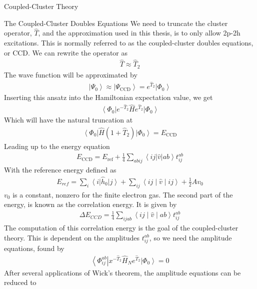 \documentclass[twoside,english]{uiofysmaster}
\begin{document}
\begin{chapter}{Coupled-Cluster Theory}
  	\begin{section}{The Coupled-Cluster Doubles Equations}
  		We need to truncate the cluster operator, $\hat T$, and the approximation used in this thesis, is to only allow 2p-2h excitations. This is normally referred to as the coupled-cluster doubles equations, or CCD. We can rewrite the operator as \cite{MHJonline}
  		\begin{align}
  			\hat T \approx \hat T_2
  		\end{align}
  		The wave function will be approximated by 
  		\begin{align}
  			\left| \Psi_0 \right> \approx \left| \Psi_{\text{CCD}} \right> = e^{\hat T_2} \left| \Phi_0 \right>
  		\end{align}
  		Inserting this ansatz into the Hamiltonian expectation value, we get
  		\begin{align}
  			\left< \Phi_0 \right| e^{-\hat T_2} \hat H e^{\hat T_2} \left| \Phi_0 \right> 
  		\end{align}
  		Which will have the natural truncation at 
  		\begin{align}
  			\left< \Phi_0 \right|  \hat H (1 + \hat T_2) \left| \Phi_0 \right> = E_{\text{CCD}}
  		\end{align}
  		Leading up to the energy equation
  		\begin{align}
  			E_{\text{CCD}} = E_{\text{ref}} + \frac{1}{4} \sum_{abij} \left<ij|\hat v|ab\right> t_{ij}^{ab}
  		\end{align}
  		With the reference energy defined as 
  		\begin{align}
  			E_{ref} = \sum_i \left< i \right| \hat h_0 \left| j\right> + \sum_{ij} \left<ij\middle|\hat v\middle|ij\right> + \frac{1}{2}Av_0
  		\end{align}
  		$v_0$ is a constant, nonzero for the finite electron gas. The second part of the energy, is known as the correlation energy. It is given by
  		\begin{align}
  			\Delta E_{CCD} = \frac{1}{4} \sum_{ijab}\left<ij\middle|\hat v\middle|ab\right> t_{ij}^{ab}
  		\end{align}
  		The computation of this correlation energy is the goal of the coupled-cluster theory. This is dependent on the amplitudes $t_{ij}^{ab}$, so we need the amplitude equations, found by
  		\begin{align}
  			\left< \Phi_{ij}^{ab} \right| x^{-\hat T_2} \hat H_N e^{\hat T_2} \left| \Phi_0 \right> = 0
  		\end{align}
  		After several applications of Wick's theorem, the amplitude equations can be reduced to 

\end{section}
\end{chapter}
\end{document}
